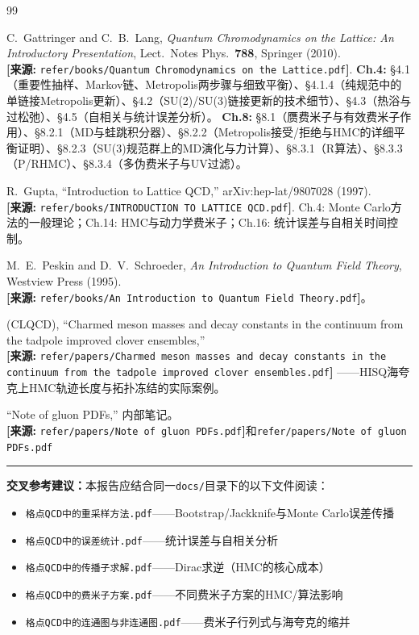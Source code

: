 \documentclass[12pt,a4paper]{ctexart}
\theoremstyle{definition}
\begin{document}
\begin{thebibliography}{99}

C.~Gattringer and C.~B.~Lang,
\textit{Quantum Chromodynamics on the Lattice: An Introductory Presentation},
Lect.\ Notes Phys.\ \textbf{788}, Springer (2010).
\\\textbf{[来源:} \texttt{refer/books/Quantum Chromodynamics on the Lattice.pdf}\textbf{]}.
\textbf{Ch.4:} §4.1（重要性抽样、Markov链、Metropolis两步骤与细致平衡）、§4.1.4（纯规范中的单链接Metropolis更新）、§4.2（SU(2)/SU(3)链接更新的技术细节）、§4.3（热浴与过松弛）、§4.5（自相关与统计误差分析）。
\textbf{Ch.8:} §8.1（赝费米子与有效费米子作用）、§8.2.1（MD与蛙跳积分器）、§8.2.2（Metropolis接受/拒绝与HMC的详细平衡证明）、§8.2.3（SU(3)规范群上的MD演化与力计算）、§8.3.1（R算法）、§8.3.3（P/RHMC）、§8.3.4（多伪费米子与UV过滤）。

R.~Gupta,
``Introduction to Lattice QCD,''
arXiv:hep-lat/9807028 (1997).
\\\textbf{[来源:} \texttt{refer/books/INTRODUCTION TO LATTICE QCD.pdf}\textbf{]}.
Ch.4: Monte Carlo方法的一般理论；Ch.14: HMC与动力学费米子；Ch.16: 统计误差与自相关时间控制。

M.~E.~Peskin and D.~V.~Schroeder,
\textit{An Introduction to Quantum Field Theory}, Westview Press (1995).
\\\textbf{[来源:} \texttt{refer/books/An Introduction to Quantum Field Theory.pdf}\textbf{]}。

(CLQCD),
``Charmed meson masses and decay constants in the continuum from the tadpole improved clover ensembles,''
\\\textbf{[来源:} \texttt{refer/papers/Charmed meson masses and decay constants in the continuum from the tadpole improved clover ensembles.pdf}\textbf{]}
——HISQ海夸克上HMC轨迹长度与拓扑冻结的实际案例。

``Note of gluon PDFs,'' 内部笔记。
\\\textbf{[来源:} \texttt{refer/papers/Note of gluon PDFs.pdf}\textbf{]}和\texttt{refer/papers/Note of gluon PDFs.pdf}

\end{thebibliography}

\vspace{0.5cm}
\noindent\rule{\textwidth}{0.5pt}
\small
\textbf{交叉参考建议：}本报告应结合同一\texttt{docs/}目录下的以下文件阅读：
\begin{itemize}[nosep]
    \item \texttt{格点QCD中的重采样方法.pdf}——Bootstrap/Jackknife与Monte Carlo误差传播
    \item \texttt{格点QCD中的误差统计.pdf}——统计误差与自相关分析
    \item \texttt{格点QCD中的传播子求解.pdf}——Dirac求逆（HMC的核心成本）
    \item \texttt{格点QCD中的费米子方案.pdf}——不同费米子方案的HMC/算法影响
    \item \texttt{格点QCD中的连通图与非连通图.pdf}——费米子行列式与海夸克的缩并
\end{itemize}
\end{document}
